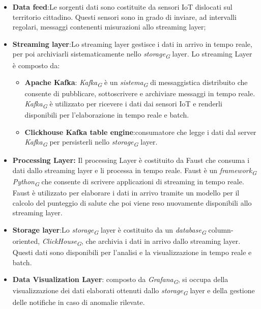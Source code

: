 \begin{itemize}
    \item \textbf{Data feed}:Le sorgenti dati sono costituite da sensori IoT dislocati sul territorio cittadino. Questi sensori sono in grado di inviare, ad intervalli regolari, messaggi contenenti misurazioni allo streaming layer;
    \item \textbf{Streaming layer}:Lo streaming layer gestisce i dati in arrivo in tempo reale, per poi archiviarli sistematicamente nello \textit{storage}\textsubscript{\textit{G}} layer. Lo streaming Layer è composto da:
    \begin{itemize}
        \item \textbf{Apache Kafka}: \textit{Kafka}\textsubscript{\textit{G}} è un \textit{sistema}\textsubscript{\textit{G}} di messaggistica distribuito che consente di pubblicare, sottoscrivere e archiviare messaggi in tempo reale. \textit{Kafka}\textsubscript{\textit{G}} è utilizzato per ricevere i dati dai sensori IoT e renderli disponibili per l'elaborazione in tempo reale e batch.
        \item \textbf{Clickhouse Kafka table engine}:consumatore che legge i
        dati dal server \textit{Kafka}\textsubscript{\textit{G}} per persisterli nello \textit{storage}\textsubscript{\textit{G}} layer.
    \end{itemize}
    \item \textbf{Processing Layer:} Il processing Layer è costituito da Faust che consuma i dati dallo streaming layer e li processa in tempo reale. Faust è un \textit{framework}\textsubscript{\textit{G}} \textit{Python}\textsubscript{\textit{G}} che consente di scrivere applicazioni di streaming in tempo reale. Faust è utilizzato per elaborare i dati in arrivo tramite un modello per il calcolo del punteggio di salute che poi viene reso nuovamente disponibili allo streaming layer.
    \item \textbf{Storage layer}:Lo \textit{storage}\textsubscript{\textit{G}} layer è costituito da un \textit{database}\textsubscript{\textit{G}} column-oriented, \textit{ClickHouse}\textsubscript{\textit{G}}, che archivia i dati in arrivo dallo streaming layer. Questi dati sono disponibili per l'analisi e la visualizzazione in tempo reale e batch.
    \item \textbf{Data Visualization Layer}: composto da \textit{Grafana}\textsubscript{\textit{G}}, si occupa della visualizzazione dei dati elaborati ottenuti dallo \textit{storage}\textsubscript{\textit{G}} layer e della gestione delle notifiche in caso di anomalie rilevate.
\end{itemize}






